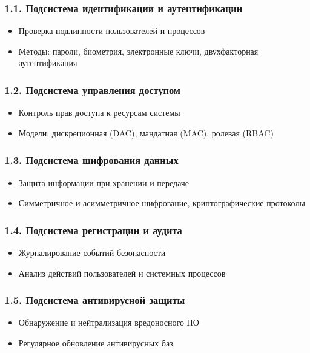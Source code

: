 \subsubsection*{1.1. Подсистема идентификации и аутентификации}
\begin{itemize}
    \item Проверка подлинности пользователей и процессов
    \item Методы: пароли, биометрия, электронные ключи, двухфакторная аутентификация
\end{itemize}

\subsubsection*{1.2. Подсистема управления доступом}
\begin{itemize}
    \item Контроль прав доступа к ресурсам системы
    \item Модели: дискреционная (DAC), мандатная (MAC), ролевая (RBAC)
\end{itemize}

\subsubsection*{1.3. Подсистема шифрования данных}
\begin{itemize}
    \item Защита информации при хранении и передаче
    \item Симметричное и асимметричное шифрование, криптографические протоколы
\end{itemize}

\subsubsection*{1.4. Подсистема регистрации и аудита}
\begin{itemize}
    \item Журналирование событий безопасности
    \item Анализ действий пользователей и системных процессов
\end{itemize}

\subsubsection*{1.5. Подсистема антивирусной защиты}
\begin{itemize}
    \item Обнаружение и нейтрализация вредоносного ПО
    \item Регулярное обновление антивирусных баз
\end{itemize}

